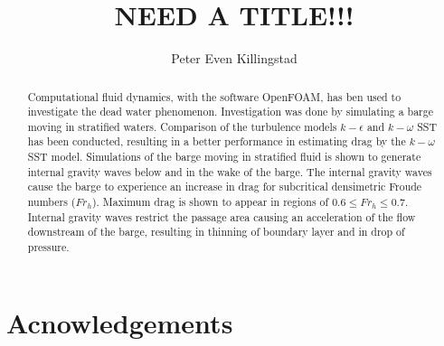 \documentclass[a4paper, 12pt]{report}
\title{NEED A TITLE!!!}
\author{Peter Even Killingstad}
\begin{document}
\masterfrontpage
\begin{abstract}
Computational fluid dynamics, with the software OpenFOAM, has ben used to investigate the dead water phenomenon. Investigation was done by simulating a barge moving in stratified waters. Comparison of the turbulence models $k-\epsilon$ and $k-\omega$ SST has been conducted, resulting in a better performance in estimating drag by the $k-\omega$ SST model. Simulations of the barge moving in stratified fluid is shown to generate internal gravity waves below and in the wake of the barge. The internal gravity waves cause the barge to experience an increase in drag for subcritical densimetric Froude numbers ($Fr_h$). Maximum drag is shown to appear in regions of $0.6 \leq Fr_h \leq 0.7$. Internal gravity waves restrict the passage area causing an acceleration of the flow downstream of the barge, resulting in thinning of boundary layer and in drop of pressure.
\end{abstract}
\chapter*{Acnowledgements}

\tableofcontents
\end{document}
